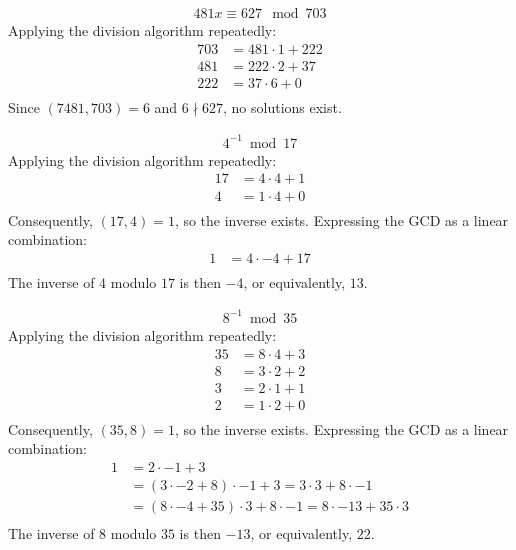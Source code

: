 \documentclass{article}
\begin{document}
\begin{align*}
    481x \equiv 627 \mod 703
\end{align*}
Applying the division algorithm repeatedly:
\begin{align*}
    703 & = 481 \cdot 1 + 222 \\
    481 & = 222 \cdot 2 + 37 \\
    222 & = 37 \cdot 6 + 0 \\
\end{align*}
Since $(7481, 703) = 6$ and $6 \nmid 627$, no solutions exist.

\clearpage
\problem{}
\begin{align*}
    4^{-1} \bmod 17
\end{align*}
Applying the division algorithm repeatedly:
\begin{align*}
    17 & = 4 \cdot 4 + 1 \\
    4 & = 1 \cdot 4 + 0 \\
\end{align*}
Consequently, $(17, 4) = 1$, so the inverse exists. Expressing the GCD as a linear combination:
\begin{align*}
    1 & = 4 \cdot -4 + 17 \\
\end{align*}
The inverse of $4$ modulo $17$ is then $-4$, or equivalently, $13$.

\begin{align*}
    8^{-1} \bmod 35
\end{align*}
Applying the division algorithm repeatedly:
\begin{align*}
    35 & = 8 \cdot 4 + 3 \\
    8 & = 3 \cdot 2 + 2 \\
    3 & = 2 \cdot 1 + 1 \\
    2 & = 1 \cdot 2 + 0 \\
\end{align*}
Consequently, $(35, 8) = 1$, so the inverse exists. Expressing the GCD as a linear combination:
\begin{align*}
    1 & = 2 \cdot -1 + 3 \\
    & = (3 \cdot -2 + 8) \cdot -1 + 3 = 3 \cdot 3 + 8 \cdot -1 \\
    & = (8 \cdot -4 + 35) \cdot 3 + 8 \cdot -1 = 8 \cdot -13 + 35 \cdot 3 \\
\end{align*}
The inverse of $8$ modulo $35$ is then $-13$, or equivalently, $22$.
\end{document}
